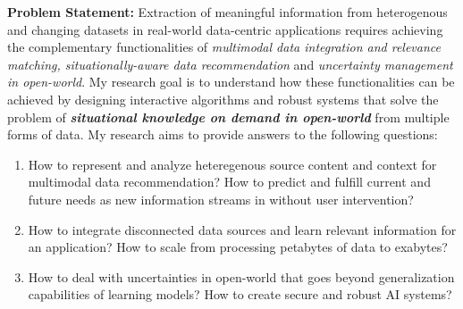 \documentclass[9pt]{article}
\begin{document}
\textbf{Problem Statement:}
Extraction of meaningful information from heterogenous and changing datasets in real-world data-centric applications requires achieving the complementary functionalities of \textit{ multimodal data integration and relevance matching, situationally-aware data recommendation} and \textit{uncertainty management in open-world}. My research goal is to understand how these functionalities can be achieved by designing interactive algorithms and robust systems that solve the problem of \textit{\textbf{situational knowledge on demand in open-world}} from multiple forms of data.
%
My research aims to provide answers to the following questions:
\begin{enumerate}[leftmargin=1.2em]
    \item How to represent and analyze heteregenous source content and context for multimodal data recommendation? How to predict and fulfill current and future needs as new information streams in without user intervention? 
    \item How to integrate disconnected data sources and learn relevant information for an application? How to scale from processing petabytes of data to exabytes?
    \item How to deal with uncertainties in open-world that goes beyond generalization capabilities of learning models? %
    How to create secure and robust AI systems?
    
\end{enumerate}
\end{document}
